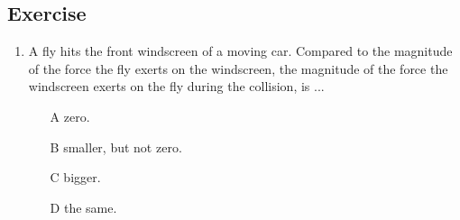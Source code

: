 \subsection{Exercise}
\begin{enumerate}
\item {A fly hits the front windscreen of a moving car. Compared to the magnitude of the force the fly exerts on the windscreen, the magnitude of the force the windscreen exerts on the fly during the collision, is ...
\begin{enumerate}
\item[A] zero.
\item[B] smaller, but not zero.
\item[C] bigger.
\item[D] the same.
\end{enumerate}}%



\end{enumerate}
